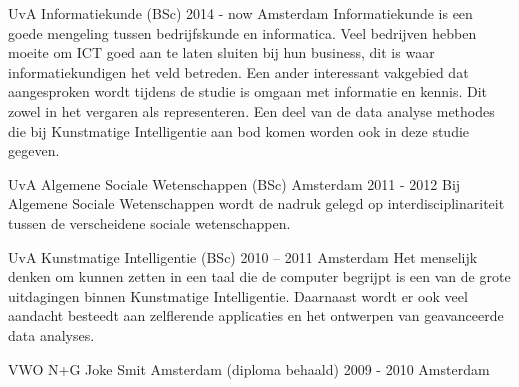 \begin{cventries}
  \cventry
    {UvA}
    {Informatiekunde (BSc)}
    {2014 - now}
    {Amsterdam}
    {Informatiekunde is een goede mengeling tussen bedrijfskunde en informatica. Veel bedrijven hebben moeite om ICT goed aan te laten sluiten bij hun business, dit is waar informatiekundigen het veld betreden. 
    Een ander interessant vakgebied dat aangesproken wordt tijdens de studie is omgaan met informatie en kennis. Dit zowel in het vergaren als representeren. Een deel van de data analyse methodes die bij Kunstmatige Intelligentie aan bod komen worden ook in deze studie gegeven.}
    {}

  \cventry
    {UvA}
    {Algemene Sociale Wetenschappen (BSc)}
    {Amsterdam}
    {2011 - 2012}
    {Bij Algemene Sociale Wetenschappen wordt de nadruk gelegd op interdisciplinariteit tussen de verscheidene sociale wetenschappen.}

  \cventry
    {UvA}
    {Kunstmatige Intelligentie (BSc)}
    {2010 – 2011}
    {Amsterdam}
    {Het menselijk denken om kunnen zetten in een taal die de computer begrijpt is een van de grote uitdagingen binnen Kunstmatige Intelligentie. Daarnaast wordt er ook veel aandacht besteedt aan zelflerende applicaties en het ontwerpen van geavanceerde data analyses.}

  \cventry
    {}
    {VWO N+G Joke Smit Amsterdam (diploma behaald)}
    {2009 - 2010}
    {Amsterdam}
    {}
\end{cventries}
